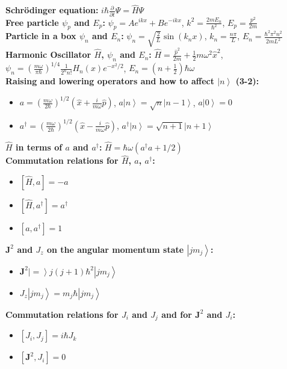 \documentclass[12pt]{extarticle}
\newcommand{\ket}[1]{\left| #1 \right>}
\begin{document}
\textbf{Schr\"odinger equation:} $i\hbar\frac{\partial}{\partial t} \Psi = \hat{H} \Psi$ \\
\textbf{Free particle $\psi_p$ and $E_p$:} $\psi_p = Ae^{ikx}+Be^{-ikx}$, $k^2=\frac{2mE_n}{\hbar^2}$, $E_p = \frac{p^2}{2m}$ \\
\textbf{Particle in a box $\psi_n$ and $E_n$:} $\psi_n = \sqrt{\frac{2}{L}}\sin{(k_nx)}$, $k_n = \frac{n\pi}{L}$, $E_n = \frac{\hbar^2\pi^2n^2}{2mL^2}$ \\
\textbf{Harmonic Oscillator $\hat{H}$, $\psi_n$ and $E_n$:} $\hat{H} = \frac{\hat{p}^2}{2m} + \frac{1}{2}m\omega^2\hat{x}^2$, $\psi_n = \left(\frac{m\omega}{\pi\hbar}\right)^{1/4}\frac{1}{2^nn!}H_n(x)e^{-x^2/2}$, $E_n = (n+\frac{1}{2})\hbar\omega$ \\
\textbf{Raising and lowering operators and how to affect $\ket{n}$ (3-2):}
\begin{itemize}
  \item $a = \left(\frac{m\omega}{2\hbar}\right)^{1/2}\left(\hat{x}+\frac{i}{m\omega}\hat{p}\right)$, $a\ket{n} = \sqrt{n}\ket{n-1}$, $a\ket{0} = 0$
  \item $a^\dagger = \left(\frac{m\omega}{2\hbar}\right)^{1/2}\left(\hat{x}-\frac{i}{m\omega}\hat{p}\right)$, $a^\dagger\ket{n} = \sqrt{n+1}\ket{n+1}$
\end{itemize}
\textbf{$\hat{H}$ in terms of $a$ and $a^\dagger$:} $\hat{H} = \hbar\omega (a^\dagger a + 1/2)$ \\
\textbf{Commutation relations for $\hat{H}$, $a$, $a^\dagger$:}
\begin{itemize}
  \item $[ \hat{H}, a ] = -a$
  \item $[ \hat{H}, a^\dagger ] = a^\dagger$
  \item $[ a, a^\dagger ] = 1$
\end{itemize}
\textbf{$\mathbf{J}^2$ and $J_z$ on the angular momentum state $\ket{jm_j}$:}
\begin{itemize}
  \item $\mathbf{J}^2\ket = j(j+1)\hbar^2\ket{jm_j}$
  \item $J_z\ket{jm_j} = m_j\hbar\ket{jm_j}$
\end{itemize}
\textbf{Commutation relations for $J_i$ and $J_j$ and for $\mathbf{J}^2$ and $J_i$:}
\begin{itemize}
  \item $[J_i, J_j] = i\hbar J_k$
  \item $[\mathbf{J}^2, J_i] = 0$
\end{itemize}
\end{document}
